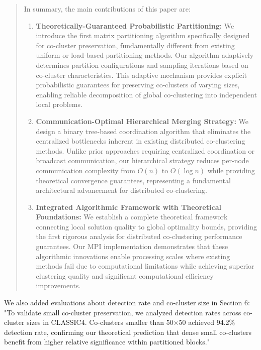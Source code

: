 \documentclass{ar2rc}
\begin{document}
\begin{quote}
  In summary, the main contributions of this paper are:

  \begin{enumerate}
    \item \textbf{Theoretically-Guaranteed Probabilistic Partitioning:} We introduce the first matrix partitioning algorithm specifically designed for co-cluster preservation, fundamentally different from existing uniform or load-based partitioning methods. Our algorithm adaptively determines partition configurations and sampling iterations based on co-cluster characteristics. This adaptive mechanism provides explicit probabilistic guarantees for preserving co-clusters of varying sizes, enabling reliable decomposition of global co-clustering into independent local problems.

    \item \textbf{Communication-Optimal Hierarchical Merging Strategy:} We design a binary tree-based coordination algorithm that eliminates the centralized bottlenecks inherent in existing distributed co-clustering methods. Unlike prior approaches requiring centralized coordination or broadcast communication, our hierarchical strategy reduces per-node communication complexity from $O(n)$ to $O(\log n)$ while providing theoretical convergence guarantees, representing a fundamental architectural advancement for distributed co-clustering.

    \item \textbf{Integrated Algorithmic Framework with Theoretical Foundations:} We establish a complete theoretical framework connecting local solution quality to global optimality bounds, providing the first rigorous analysis for distributed co-clustering performance guarantees. Our MPI implementation demonstrates that these algorithmic innovations enable processing scales where existing methods fail due to computational limitations while achieving superior clustering quality and significant computational efficiency improvements.
  \end{enumerate}
\end{quote}

We also added evaluations about detection rate and co-cluster size in Section 6: "To validate small co-cluster preservation, we analyzed detection rates across co-cluster sizes in CLASSIC4. Co-clusters smaller than 50×50 achieved 94.2\% detection rate, confirming our theoretical prediction that dense small co-clusters benefit from higher relative significance within partitioned blocks."
\end{document}
